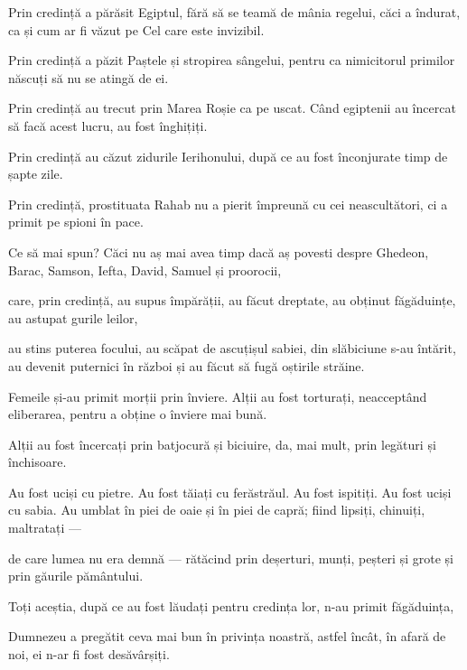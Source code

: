 {Prin credință a părăsit Egiptul, fără să se teamă de mânia regelui, căci a îndurat, ca și cum ar fi văzut pe Cel care este invizibil.

Prin credință a păzit Paștele și stropirea sângelui, pentru ca nimicitorul primilor născuți să nu se atingă de ei.


\par }{\PP {}Prin credință au trecut prin Marea Roșie ca pe uscat. Când egiptenii au încercat să facă acest lucru, au fost înghițiți.


\par }{\PP {}Prin credință au căzut zidurile Ierihonului, după ce au fost înconjurate timp de șapte zile.


\par }{\PP {}Prin credință, prostituata Rahab nu a pierit împreună cu cei neascultători, ci a primit pe spioni în pace.


\par }{\PP {}Ce să mai spun? Căci nu aș mai avea timp dacă aș povesti despre Ghedeon, Barac, Samson, Iefta, David, Samuel și proorocii,

care, prin credință, au supus împărății, au făcut dreptate, au obținut făgăduințe, au astupat gurile leilor,

au stins puterea focului, au scăpat de ascuțișul sabiei, din slăbiciune s-au întărit, au devenit puternici în război și au făcut să fugă oștirile străine.

Femeile și-au primit morții prin înviere. Alții au fost torturați, neacceptând eliberarea, pentru a obține o înviere mai bună.

Alții au fost încercați prin batjocură și biciuire, da, mai mult, prin legături și închisoare.

Au fost uciși cu pietre. Au fost tăiați cu ferăstrăul. Au fost ispitiți. Au fost uciși cu sabia. Au umblat în piei de oaie și în piei de capră; fiind lipsiți, chinuiți, maltratați —

de care lumea nu era demnă — rătăcind prin deșerturi, munți, peșteri și grote și prin găurile pământului.


\par }{\PP {}Toți aceștia, după ce au fost lăudați pentru credința lor, n-au primit făgăduința,

Dumnezeu a pregătit ceva mai bun în privința noastră, astfel încât, în afară de noi, ei n-ar fi fost desăvârșiți.



}
